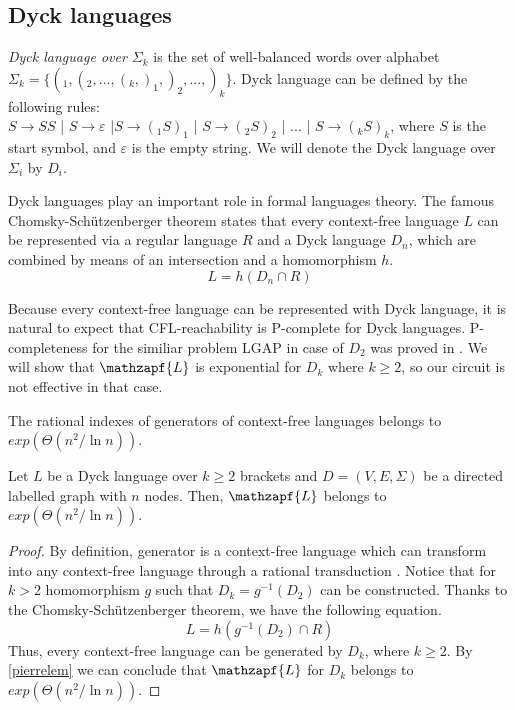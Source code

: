 \subsection{Dyck languages}
\textit{Dyck language over $\Sigma_k$} is the set of well-balanced words over alphabet $\Sigma_k = \{(_1, (_2, ..., (_k, )_1, )_2, ..., )_k\}$. Dyck language can be defined by the following rules:
\\$S \rightarrow SS$ | $S \rightarrow \varepsilon$ |$S \rightarrow (_1S)_1$ | $S \rightarrow (_2S)_2$ | ... | $S \rightarrow (_kS)_k$, where $S$ is the start symbol, and $\varepsilon$ is the empty string. We will denote the Dyck language over $\Sigma_i$ by $D_i$.


Dyck languages play an important role in formal languages theory. The famous Chomsky-Sch\"utzenberger theorem states that every context-free language $L$ can be represented via a regular language $R$ and a Dyck language $D_n$, which are combined by means of an intersection and a homomorphism $h$. 
\begin{equation}
L = h(D_n \cap R)
\end{equation}


Because every context-free language can be represented with Dyck language, it is natural to expect that CFL-reachability is P-complete for Dyck languages. P-completeness for the similiar problem LGAP in case of $D_2$ was proved in \cite*{PCompl, LReach, Regularrealizability}. We will show that $\mathzapf{L}$ is exponential for $D_k$ where $k\ge2$, so our circuit is not effective in that case.
\begin{lemma}[Pierre]
\label{pierrelem}
The rational indexes of generators of context-free languages belongs to $exp(\Theta(n^2/\ln n))$.
\end{lemma}
\begin{theorem}
Let $L$ be a Dyck language over $k \ge 2$ brackets and $D=(V, E, \Sigma)$ be a directed labelled graph with $n$ nodes. Then, $\mathzapf{L}$  belongs to $exp(\Theta(n^2/\ln n))$.
\end{theorem}
\begin{proof}
By definition, generator is a context-free language which can transform into any context-free language through a rational transduction \cite{CFRat}.
Notice that for $k>2$ homomorphism $g$ such that $D_k = g^{-1}(D_2)$ can be constructed. Thanks to the Chomsky-Sch\"utzenberger theorem, we have the following equation.
\begin{equation}
L = h(g^{-1}(D_2)\cap R)
\end{equation}
Thus, every context-free language can be generated by $D_k$, where $k \ge 2$. By \ref{pierrelem} we can conclude that $\mathzapf{L}$ for $D_k$ belongs to $exp(\Theta(n^2/\ln n))$. 
\end{proof}

